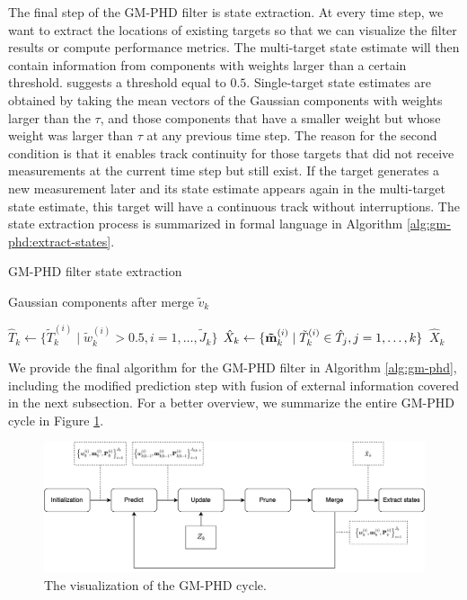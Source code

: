 The final step of the GM-PHD filter is state extraction. At every time step, we want to extract the locations of existing targets so that we can visualize the filter results or compute performance metrics. The multi-target state estimate will then contain information from components with weights larger than a certain threshold. \cite{voGaussianMixtureProbability2006} suggests a threshold equal to $0.5$. Single-target state estimates are obtained by taking the mean vectors of the Gaussian components with weights larger than the $\tau$, and those components that have a smaller weight but whose weight was larger than $\tau$ at any previous time step. The reason for the second condition is that it enables track continuity for those targets that did not receive measurements at the current time step but still exist. If the target generates a new measurement later and its state estimate appears again in the multi-target state estimate, this target will have a continuous track without interruptions. The state extraction process is summarized in formal language in Algorithm \ref{alg:gm-phd:extract-states}.

\begin{algorithm}
\caption{GM-PHD filter state extraction}\label{alg:gm-phd:extract-states}
\begin{algorithmic}[1]
    \Require Gaussian components after merge $\tilde{v}_k$
    \item[]
        \State $\hat{T}_k \gets \{ \tilde{T}_k^{(i)} \mid \tilde{w}_{k}^{(i)} > 0.5 , i = 1, \ldots, \tilde{J}_{k}\}$
        \State $\hat{X}_k \gets \{ \vecat{\tilde{m}}{k}^{(i)} \mid \tilde{T}_{k}^{(i)} \in \hat{T}_j, j = 1, \ldots, k \}$
        \State \Return $\hat{X}_k$
    \EndProcedure
\end{algorithmic}
\end{algorithm}

We provide the final algorithm for the GM-PHD filter in Algorithm \ref{alg:gm-phd}, including the modified prediction step with fusion of external information covered in the next subsection. For a better overview, we summarize the entire GM-PHD cycle in Figure \ref{fig:gm-phd-cycle}.

\begin{figure}
    \centering
    \includegraphics[width=.95\linewidth]{figures/gm-phd-cycle.png}
    \caption[GM-PHD Cycle.]{The visualization of the GM-PHD cycle.}
    \label{fig:gm-phd-cycle}
\end{figure}
